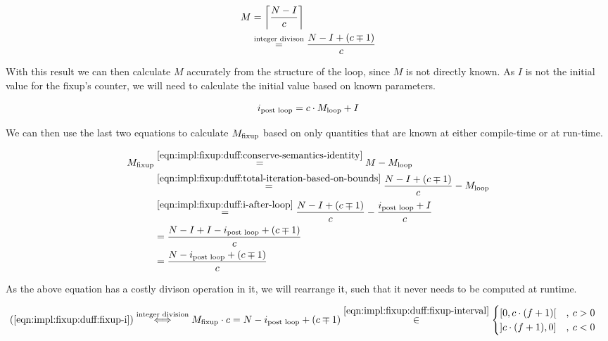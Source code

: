 \begin{equation}\label{eqn:impl:fixup:duff:total-iteration-based-on-bounds}
\begin{aligned}
    M &= \left\lceil{}\frac{N - I}{c}\right\rceil{} \\
    & \overset{\text{integer divison}}{=} \frac{N - I + (c \mp 1)}{c}
\end{aligned}
\end{equation}

With this result we can then calculate $M$ accurately from the structure of the loop, since $M$ is not directly known.
As $I$ is not the initial value for the fixup's counter, we will need to calculate the initial value based on known parameters.

\begin{equation}\label{eqn:impl:fixup:duff:i-after-loop}
\begin{aligned}
    i_\text{post loop} = c \cdot M_{\text{loop}} + I
\end{aligned}
\end{equation}

We can then use the last two equations to calculate $M_{\text{fixup}}$ based on only quantities that are known at either compile-time or at run-time.

\begin{equation}\label{eqn:impl:fixup:duff:fixup-i}
\begin{aligned}
    M_{\text{fixup}} & \overset{\ref{eqn:impl:fixup:duff:conserve-semantics-identity}}{=} M - M_{\text{loop}} \\
    & \overset{\ref{eqn:impl:fixup:duff:total-iteration-based-on-bounds}}{=}
    \frac{N - I + (c \mp 1)}{c} - M_{\text{loop}} \\
    & \overset{\ref{eqn:impl:fixup:duff:i-after-loop}}{=}
    \frac{N - I + (c \mp 1)}{c} - \frac{i_\text{post loop} + I}{c} \\
    &= \frac{N - I + I - i_\text{post loop} + (c \mp 1)}{c}\\
    &= \frac{N - i_\text{post loop} + (c \mp 1)}{c}
\end{aligned}
\end{equation}

As the above equation has a costly divison operation in it, we will rearrange it, such that it never needs to be computed at runtime.

\begin{equation}\label{eqn:impl:fixup:duff:fixup-i-mult}
\begin{aligned}
    (\ref{eqn:impl:fixup:duff:fixup-i}) &\overset{\text{integer division}}{\Longleftrightarrow} M_{\text{fixup}} \cdot c = N - i_\text{post loop} + (c \mp 1) \overset{\ref{eqn:impl:fixup:duff:fixup-interval}}{\in}  \begin{cases} \lbrack 0, c \cdot (f + 1) \lbrack &, \medspace c > 0\\ \rbrack c \cdot (f + 1), 0 \rbrack &, \medspace c < 0 \end{cases} 
\end{aligned}
\end{equation}

